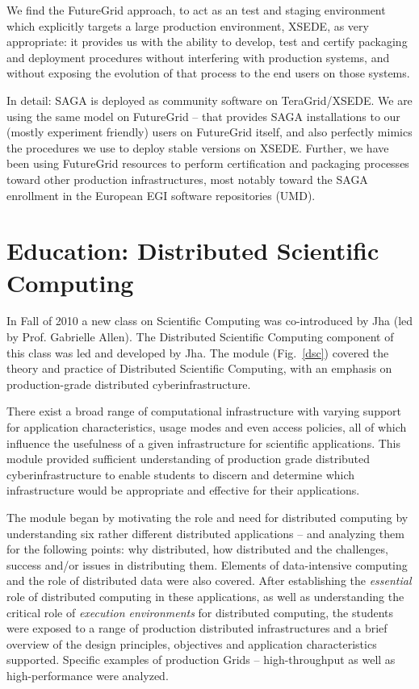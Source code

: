 \documentclass[]{paper}
\begin{document}
 We find the FutureGrid approach, to act as an test and staging
 environment which explicitly targets a large production environment,
 XSEDE, as very appropriate: it provides us with the ability to
 develop, test and certify packaging and deployment procedures without
 interfering with production systems, and without exposing the
 evolution of that process to the end users on those systems.  

 In detail: SAGA is deployed as community software on TeraGrid/XSEDE.
 We are using the same model on FutureGrid -- that provides SAGA
 installations to our (mostly experiment friendly) users on FutureGrid
 itself, and also perfectly mimics the procedures we use to deploy
 stable versions on XSEDE.  Further, we have been using FutureGrid
 resources to perform certification and packaging processes toward
 other production infrastructures, most notably toward the SAGA
 enrollment in the European EGI software repositories (UMD).


\section{Education: Distributed Scientific Computing}
\label{sec:edu}

In Fall of 2010 a new class on Scientific Computing was co-introduced
by Jha (led by Prof. Gabrielle Allen). The Distributed Scientific
Computing component of this class was led and developed by Jha.  The
module (Fig.~\ref{dsc}) covered the theory and practice of Distributed
Scientific Computing, with an emphasis on production-grade distributed
cyberinfrastructure.

There exist a broad range of computational infrastructure with varying
support for application characteristics, usage modes and even access
policies, all of which influence the usefulness of a given
infrastructure for scientific applications.  This module provided
sufficient understanding of production grade distributed
cyberinfrastructure to enable students to discern and determine which
infrastructure would be appropriate and effective for their
applications.

The module began by motivating the role and need for distributed
computing by understanding six rather different distributed
applications -- and analyzing them for the following points: why
distributed, how distributed and the challenges, success and/or issues
in distributing them. Elements of data-intensive computing and the
role of distributed data were also covered.  After establishing the
{\it essential} role of distributed computing in these applications,
as well as understanding the critical role of {\it execution
  environments} for distributed computing, the students were exposed
to a range of production distributed infrastructures and a brief
overview of the design principles, objectives and application
characteristics supported.  Specific examples of production Grids --
high-throughput as well as high-performance were analyzed.
\end{document}
